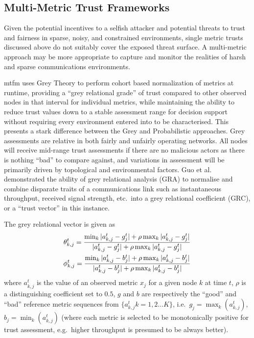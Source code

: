 \subsection{Multi-Metric Trust Frameworks}\label{sec:multimetrictrust}
Given the potential incentives to a selfish attacker and potential threats to trust and fairness in sparse, noisy, and constrained environments, single metric trusts discussed above do not suitably cover the exposed threat surface.
A multi-metric approach may be more appropriate to capture and monitor the realities of harsh and sparse communications environments.

\gls{mtfm}\cite{Guo11} uses Grey Theory\cite{Zuo1995} to perform cohort based normalization of metrics at runtime, providing a ``grey relational grade'' of trust compared to other observed nodes in that interval for individual metrics, while maintaining the ability to reduce trust values down to a stable assessment range for decision support without requiring every environment entered into to be characterised.
This presents a stark difference between the Grey and Probabilistic approaches.
Grey assessments are relative in both fairly and unfairly operating networks.
All nodes will receive mid-range trust assessments if there are no malicious actors as there is nothing ``bad'' to compare against, and variations in assessment will be primarily driven by topological and environmental factors.
Guo et al.\cite{Guo11} demonstrated the ability of grey relational analysis (GRA) to normalise and combine disparate traits of a communications link such as instantaneous throughput, received signal strength, etc.\ into a grey relational coefficient (GRC), or a ``trust vector'' in this instance.

The grey relational vector is given as
%
\begin{align}
  \label{eq:grc}
  \theta_{k,j}^t = \frac{\min_k|a_{k,j}^t - g_j^t| + \rho \max_k|a_{k,j}^t-g_j^t|}{|a_{k,j}^t-g_j^t| + \rho \max_k|a_{k,j}^t-g_j^t|} \\
  \phi_{k,j}^t = \frac{\min_k|a_{k,j}^t - b_j^t| + \rho \max_k|a_{k,j}^t-b_j^t|}{|a_{k,j}^t-b_j^t| + \rho \max_k|a_{k,j}^t-b_j^t|} \notag 
\end{align}
%
where $a_{k,j}^t$ is the value of an observed metric $x_j$ for a given node $k$ at time $t$, $\rho$ is a distinguishing coefficient set to $0.5$, $g$ and $b$ are respectively the ``good'' and ``bad'' reference metric sequences from $\{a_{k,j}^t k=1,2\dots K\}$, i.e.\ $g_j=\max_k({a_{k,j}^t})$,  $b_j=\min_k({a_{k,j}^t})$ (where each metric is selected to be monotonically positive for trust assessment, e.g.\ higher throughput is presumed to be always better).

